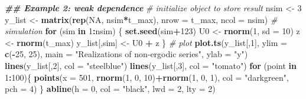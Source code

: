 \documentclass[
]{book}
\newenvironment{Shaded}{\begin{snugshade}}{\end{snugshade}}
\newcommand{\AttributeTok}[1]{\textcolor[rgb]{0.13,0.29,0.53}{#1}}
\newcommand{\CommentTok}[1]{\textcolor[rgb]{0.56,0.35,0.01}{\textit{#1}}}
\newcommand{\ConstantTok}[1]{\textcolor[rgb]{0.56,0.35,0.01}{#1}}
\newcommand{\ControlFlowTok}[1]{\textcolor[rgb]{0.13,0.29,0.53}{\textbf{#1}}}
\newcommand{\DecValTok}[1]{\textcolor[rgb]{0.00,0.00,0.81}{#1}}
\newcommand{\DocumentationTok}[1]{\textcolor[rgb]{0.56,0.35,0.01}{\textbf{\textit{#1}}}}
\newcommand{\FunctionTok}[1]{\textcolor[rgb]{0.13,0.29,0.53}{\textbf{#1}}}
\newcommand{\NormalTok}[1]{#1}
\newcommand{\OtherTok}[1]{\textcolor[rgb]{0.56,0.35,0.01}{#1}}
\newcommand{\SpecialCharTok}[1]{\textcolor[rgb]{0.81,0.36,0.00}{\textbf{#1}}}
\newcommand{\StringTok}[1]{\textcolor[rgb]{0.31,0.60,0.02}{#1}}
\begin{document}
\begin{Shaded}
\begin{Highlighting}[]
\DocumentationTok{\#\# Example 2: weak dependence}
\CommentTok{\# initialize object to store result}
\NormalTok{nsim }\OtherTok{\textless{}{-}} \DecValTok{3}
\NormalTok{y\_list }\OtherTok{\textless{}{-}} \FunctionTok{matrix}\NormalTok{(}\FunctionTok{rep}\NormalTok{(}\ConstantTok{NA}\NormalTok{, nsim}\SpecialCharTok{*}\NormalTok{t\_max), }\AttributeTok{nrow =}\NormalTok{ t\_max, }\AttributeTok{ncol =}\NormalTok{ nsim)}
\CommentTok{\# simulation}
\ControlFlowTok{for}\NormalTok{ (sim }\ControlFlowTok{in} \DecValTok{1}\SpecialCharTok{:}\NormalTok{nsim) \{}
  \FunctionTok{set.seed}\NormalTok{(sim}\SpecialCharTok{+}\DecValTok{123}\NormalTok{)}
\NormalTok{  U0 }\OtherTok{\textless{}{-}} \FunctionTok{rnorm}\NormalTok{(}\DecValTok{1}\NormalTok{, }\AttributeTok{sd =} \DecValTok{10}\NormalTok{)}
\NormalTok{  z  }\OtherTok{\textless{}{-}} \FunctionTok{rnorm}\NormalTok{(t\_max)}
\NormalTok{  y\_list[,sim] }\OtherTok{\textless{}{-}}\NormalTok{ U0 }\SpecialCharTok{+}\NormalTok{ z}
\NormalTok{\}}
\CommentTok{\# plot}
\FunctionTok{plot.ts}\NormalTok{(y\_list[,}\DecValTok{1}\NormalTok{], }\AttributeTok{ylim =} \FunctionTok{c}\NormalTok{(}\SpecialCharTok{{-}}\DecValTok{25}\NormalTok{, }\DecValTok{25}\NormalTok{), }\AttributeTok{main =} \StringTok{"Realizations of non{-}ergodic series"}\NormalTok{, }\AttributeTok{ylab =} \StringTok{"y"}\NormalTok{)}
\FunctionTok{lines}\NormalTok{(y\_list[,}\DecValTok{2}\NormalTok{], }\AttributeTok{col =} \StringTok{"steelblue"}\NormalTok{)}
\FunctionTok{lines}\NormalTok{(y\_list[,}\DecValTok{3}\NormalTok{], }\AttributeTok{col =} \StringTok{"tomato"}\NormalTok{)}
\ControlFlowTok{for}\NormalTok{ (point }\ControlFlowTok{in} \DecValTok{1}\SpecialCharTok{:}\DecValTok{100}\NormalTok{)\{}
  \FunctionTok{points}\NormalTok{(}\AttributeTok{x =} \DecValTok{501}\NormalTok{, }\FunctionTok{rnorm}\NormalTok{(}\DecValTok{1}\NormalTok{, }\DecValTok{0}\NormalTok{, }\DecValTok{10}\NormalTok{)}\SpecialCharTok{+}\FunctionTok{rnorm}\NormalTok{(}\DecValTok{1}\NormalTok{, }\DecValTok{0}\NormalTok{, }\DecValTok{1}\NormalTok{), }\AttributeTok{col =} \StringTok{"darkgreen"}\NormalTok{, }\AttributeTok{pch =} \DecValTok{4}\NormalTok{)}
\NormalTok{\}}
\FunctionTok{abline}\NormalTok{(}\AttributeTok{h =} \DecValTok{0}\NormalTok{, }\AttributeTok{col =} \StringTok{"black"}\NormalTok{, }\AttributeTok{lwd =} \DecValTok{2}\NormalTok{, }\AttributeTok{lty =} \DecValTok{2}\NormalTok{)}
\end{Highlighting}
\end{Shaded}
\end{document}
